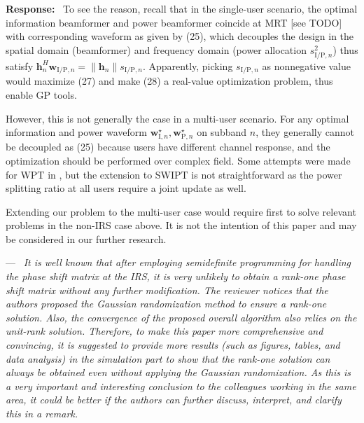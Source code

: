 \documentclass{article}
\newcounter{reviewer}
\newcounter{point}[reviewer]
\renewcommand{\thepoint}
	{\thereviewer.\arabic{point}}
\newenvironment{point}
	{\refstepcounter{point} \bigskip \noindent {\textbf{Comment~\thepoint} } ---\ \itshape}
	{\par}
\newenvironment{response}
	{\medskip \noindent \textbf{Response:}\ }
	{\medskip}
\begin{document}
\begin{reviewersection}
\begin{response}
			To see the reason, recall that in the single-user scenario, the optimal information beamformer and power beamformer coincide at MRT [see TODO] with corresponding waveform as given by (25), which decouples the design in the spatial domain (beamformer) and frequency domain (power allocation $s_{\mathrm{I/P},n}^2$) thus satisfy $\boldsymbol{h}_n^H\boldsymbol{w}_{\mathrm{I/P},n}=\lVert{\boldsymbol{h}_n}\rVert s_{\mathrm{I/P},n}$. Apparently, picking $s_{\mathrm{I/P}, n}$ as nonnegative value would maximize (27) and make (28) a real-value optimization problem, thus enable GP tools.

			However, this is not generally the case in a multi-user scenario. For any optimal information and power waveform $\boldsymbol{w}_{\mathrm{I}, n}^{\star}, \boldsymbol{w}_{\mathrm{P}, n}^{\star}$ on subband $n$, they generally cannot be decoupled as (25) because users have different channel response, and the optimization should be performed over complex field. Some attempts were made for WPT in \cite{Huang2017a}, but the extension to SWIPT is not straightforward as the power splitting ratio at all users require a joint update as well.

			Extending our problem to the multi-user case would require first to solve relevant problems in the non-IRS case above. It is not the intention of this paper and may be considered in our further research.
		\end{response}

		\begin{point}
			It is well known that after employing semidefinite programming for handling the phase shift matrix at the IRS, it is very unlikely to obtain a rank-one phase shift matrix without any further modification. The reviewer notices that the authors proposed the Gaussian randomization method to ensure a rank-one solution. Also, the convergence of the proposed overall algorithm also relies on the unit-rank solution. Therefore, to make this paper more comprehensive and convincing, it is suggested to provide more results (such as figures, tables, and data analysis) in the simulation part to show that the rank-one solution can always be obtained even without applying the Gaussian randomization. As this is a very important and interesting conclusion to the colleagues working in the same area, it could be better if the authors can further discuss, interpret, and clarify this in a remark.
		\end{point}


\end{reviewersection}
\end{document}
